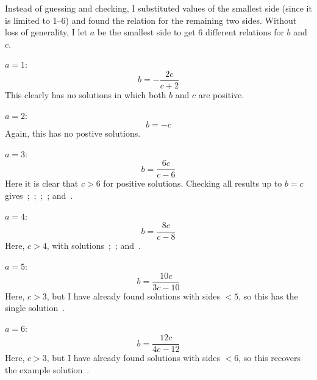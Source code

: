 \documentclass{article}
\begin{document}
Instead of guessing and checking, I substituted values of the smallest side (since it is limited to 1--6) and found the relation for the remaining two sides.
Without loss of generality, I let $a$ be the smallest side to get 6 different relations for $b$ and $c$.

\vspace{0.2in}

$a=1$:
\begin{equation*}
b=-\frac{2c}{c+2}
\end{equation*}
This clearly has no solutions in which both $b$ and $c$ are positive.

\vspace{0.2in}

$a=2$:
\begin{equation*}
b=-c
\end{equation*}
Again, this has no postive solutions.

\vspace{0.2in}

$a=3$:
\begin{equation*}
b=\frac{6c}{c-6}
\end{equation*}
Here it is clear that $c>6$ for positive solutions.
Checking all results up to $b=c$ gives
\,;
\,;
\,;
\,; and
\,.

\vspace{0.2in}

$a=4$:
\begin{equation*}
b=\frac{8c}{c-8}
\end{equation*}
Here, $c>4$, with solutions
\,;
\,; and
\,.


\vspace{0.2in}

$a=5$:
\begin{equation*}
b=\frac{10c}{3c-10}
\end{equation*}
Here, $c>3$, but I have already found solutions with sides $<5$, so this has the single solution
\,.

\vspace{0.2in}

$a=6$:
\begin{equation*}
b=\frac{12c}{4c-12}
\end{equation*}
Here, $c>3$, but I have already found solutions with sides $<6$, so this recovers the example solution
\,.
\end{document}
